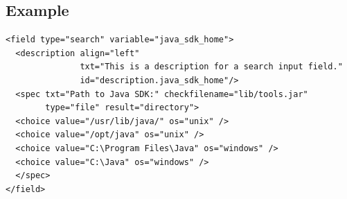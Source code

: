 \subsection{Example}

\footnotesize
\begin{verbatim}
<field type="search" variable="java_sdk_home">
  <description align="left" 
               txt="This is a description for a search input field."
               id="description.java_sdk_home"/>
  <spec txt="Path to Java SDK:" checkfilename="lib/tools.jar"
        type="file" result="directory">
  <choice value="/usr/lib/java/" os="unix" />
  <choice value="/opt/java" os="unix" />
  <choice value="C:\Program Files\Java" os="windows" />
  <choice value="C:\Java" os="windows" />
  </spec>
</field>
\end{verbatim}
\normalsize
